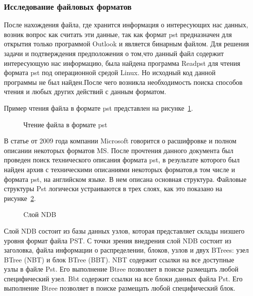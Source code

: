 \subsubsection{Исследование файловых форматов}

После нахождения файла, где хранится информация о интересующих нас данных,  
возник вопрос как считать эти данные, так как формат pst предназначен для открытия только программой  Outlook и является бинарным файлом. Для  
решения задачи и подтверждения предположения о том,что данный файл содержит интересующую нас информацию, была найдена программа Readpst для чтения формата  pst под  
операционной средой Linux. Но исходный код  данной программы не был найден.После чего возникла необходимость поиска способов
чтения и любых других действий с данным форматом. 

Пример чтения файла в формате pst представлен на рисунке~\ref{pst:pst}.

\begin{figure}[h!]
\caption{Чтение файла в формате pst}
\label{pst:pst}
\end{figure}

В статье от 2009 года компании Microsoft говорится о расшифровке и полном описании  
некоторых форматов MS. После прочтения данного документа был проведен поиск технического описания формата pst, в результате которого был найден архив с техническими описаниями некоторых форматов,в том  
числе и формата pst, на английском языке. В нем описана  основная структура. Файловые структуры Pst логически устраиваются в трех слоях, как это показано на рисунке~\ref{andrey_pic:andrey_pic}.

\begin{figure}[h!]                                                %
\caption{Cлой NDB}
\label{andrey_pic:andrey_pic}
\end{figure}

Слой NDB состоит из базы данных узлов, которая представляет склады низшего уровня 
формат файла PST. С точки зрения внедрения слой NDB состоит из заголовка, файла 
информации о распределении, блоков, узлов и двух BTrees: узел BTree (NBT) и блок BTree 
(BBT). NBT содержит ссылки на все доступные узлы в файле Pst. Его выполнение Btree 
позволяет в поиске размещать любой специфический узел. Bbt содержит ссылки на все  блоки данных файла Pst. Его выполнение Btree позволяет в поиске размещать любой специфический блок.


